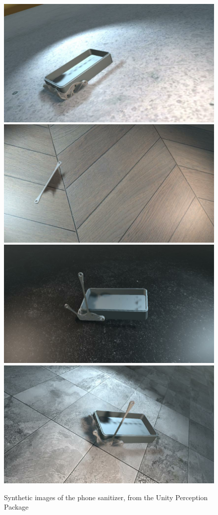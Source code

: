 \begin{figure}
  \includegraphics[width=0.5\columnwidth]{figures/sanitizer/unity1.png}
  \includegraphics[width=0.5\columnwidth]{figures/sanitizer/unity2.png}
  \includegraphics[width=0.5\columnwidth]{figures/sanitizer/unity3.png}
  \includegraphics[width=0.5\columnwidth]{figures/sanitizer/unity4.png}
  \caption{
    Synthetic images of the phone sanitizer, from the Unity Perception Package
  }\label{fig:sanitizer_unity}
\end{figure}

